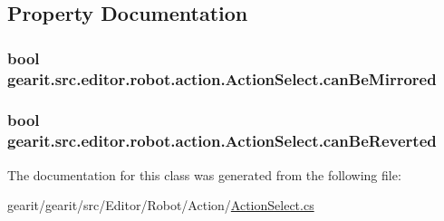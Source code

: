 \subsection{Property Documentation}
\hypertarget{classgearit_1_1src_1_1editor_1_1robot_1_1action_1_1_action_select_acd1e38ed74fc37f392c342ee880c5512}{
\subsubsection[{can\+Be\+Mirrored}]{\setlength{\rightskip}{0pt plus 5cm}bool gearit.\+src.\+editor.\+robot.\+action.\+Action\+Select.\+can\+Be\+Mirrored\hspace{0.3cm}{\ttfamily [get]}}}\label{classgearit_1_1src_1_1editor_1_1robot_1_1action_1_1_action_select_acd1e38ed74fc37f392c342ee880c5512}
\hypertarget{classgearit_1_1src_1_1editor_1_1robot_1_1action_1_1_action_select_a59d23b90805e4d9a013203f08d95780c}{
\subsubsection[{can\+Be\+Reverted}]{\setlength{\rightskip}{0pt plus 5cm}bool gearit.\+src.\+editor.\+robot.\+action.\+Action\+Select.\+can\+Be\+Reverted\hspace{0.3cm}{\ttfamily [get]}}}\label{classgearit_1_1src_1_1editor_1_1robot_1_1action_1_1_action_select_a59d23b90805e4d9a013203f08d95780c}


The documentation for this class was generated from the following file\+:\begin{DoxyCompactItemize}
\item 
gearit/gearit/src/\+Editor/\+Robot/\+Action/\hyperlink{_robot_2_action_2_action_select_8cs}{Action\+Select.\+cs}\end{DoxyCompactItemize}
